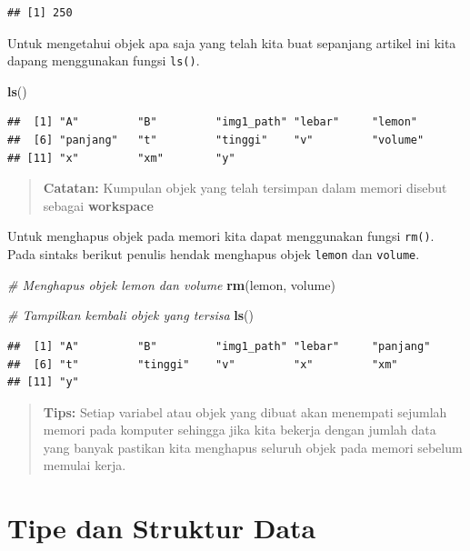 \documentclass[]{book}
\newenvironment{Shaded}{\begin{snugshade}}{\end{snugshade}}
\newcommand{\CommentTok}[1]{\textcolor[rgb]{0.56,0.35,0.01}{\textit{#1}}}
\newcommand{\KeywordTok}[1]{\textcolor[rgb]{0.13,0.29,0.53}{\textbf{#1}}}
\newcommand{\NormalTok}[1]{#1}
\theoremstyle{definition}
\theoremstyle{definition}
\theoremstyle{definition}
\theoremstyle{remark}
\begin{document}
\begin{verbatim}
## [1] 250
\end{verbatim}

Untuk mengetahui objek apa saja yang telah kita buat sepanjang artikel ini kita dapang menggunakan fungsi \texttt{ls()}.

\begin{Shaded}
\begin{Highlighting}[]
\KeywordTok{ls}\NormalTok{()}
\end{Highlighting}
\end{Shaded}

\begin{verbatim}
##  [1] "A"         "B"         "img1_path" "lebar"     "lemon"    
##  [6] "panjang"   "t"         "tinggi"    "v"         "volume"   
## [11] "x"         "xm"        "y"
\end{verbatim}

\begin{quote}
\textbf{Catatan:} Kumpulan objek yang telah tersimpan dalam memori disebut sebagai \textbf{workspace}
\end{quote}

Untuk menghapus objek pada memori kita dapat menggunakan fungsi \texttt{rm()}. Pada sintaks berikut penulis hendak menghapus objek \texttt{lemon} dan \texttt{volume}.

\begin{Shaded}
\begin{Highlighting}[]
\CommentTok{# Menghapus objek lemon dan volume}
\KeywordTok{rm}\NormalTok{(lemon, volume)}

\CommentTok{# Tampilkan kembali objek yang tersisa}
\KeywordTok{ls}\NormalTok{()}
\end{Highlighting}
\end{Shaded}

\begin{verbatim}
##  [1] "A"         "B"         "img1_path" "lebar"     "panjang"  
##  [6] "t"         "tinggi"    "v"         "x"         "xm"       
## [11] "y"
\end{verbatim}

\begin{quote}
\textbf{Tips:} Setiap variabel atau objek yang dibuat akan menempati sejumlah memori pada komputer sehingga jika kita bekerja dengan jumlah data yang banyak pastikan kita menghapus seluruh objek pada memori sebelum memulai kerja.
\end{quote}

\hypertarget{typedata}{%
\section{Tipe dan Struktur Data}\label{typedata}}
\end{document}
